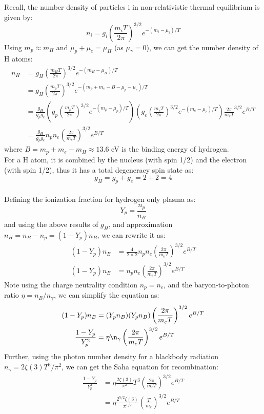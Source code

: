 \bigskip \noindent
\begin{foundation}
    Recall, the number density of particles i in non-relativistic thermal equilibrium is given by:
    \[
        n_i = g_i \left( \frac{m_i T}{2\pi} \right)^{3/2} e^{-(m_i - \mu_i)/T}
    \]
    Using $m_p \approx m_H$ and $\mu_p + \mu_e = \mu_H$ (as $\mu_\gamma = 0$), we can get the number density of H atoms:
    \small \begin{align*}
        n_H &= g_H \left( \frac{m_H T}{2\pi} \right)^{3/2} e^{-(m_H - \mu_H)/T} \\
        &= g_H \left( \frac{m_p T}{2\pi} \right)^{3/2} e^{-(m_p + m_e - B - \mu_p - \mu_e)/T} \\
        &= \frac{g_H}{g_p g_e} \left( g_p \left( \frac{m_p T}{2\pi} \right)^{3/2} e^{-(m_p - \mu_p)/T} \right) \left( g_e \left( \frac{m_e T}{2\pi} \right)^{3/2} e^{-(m_e - \mu_e)/T} \right)  \frac{2\pi}{m_e T}^{3/2} e^{B/T} \\
        &= \frac{g_H}{g_p g_e} n_p n_e \left( \frac{2\pi}{m_e T} \right)^{3/2} e^{B/T}
    \end{align*}
    \normalsize where $B = m_p + m_e - m_H \approx 13.6$ eV is the binding energy of hydrogen.\\

    For a H atom, it is combined by the nucleus (with spin 1/2) and the electron (with spin 1/2), thus it has a total degeneracy spin state as:
    \[
        g_H = g_p + g_e = 2 + 2 = 4
    \] \\

    Defining the ionization fraction for hydrogen only plasma as:
    \[
        Y_p = \frac{n_p}{n_B} 
    \]
    and using the above results of $g_H$, and approximation $n_H = n_B - n_p = (1 - Y_p) n_B$, we can rewrite it as:
    \begin{align*}
        (1 - Y_p) n_B &= \frac{4}{2 \times 2} n_p n_e \left( \frac{2\pi}{m_e T} \right)^{3/2} e^{B/T} \\
        (1 - Y_p) n_B &= n_p n_e \left( \frac{2\pi}{m_e T} \right)^{3/2} e^{B/T} 
    \end{align*} 
    Note using the charge neutrality condition $n_p = n_e$, and the baryon-to-photon ratio $\eta = n_B/n_\gamma$, we can simplify the equation as:
    \begin{align*}
       (1 - Y_p) n_B &= (Y_p n_B) (Y_p n_B) \left( \frac{2\pi}{m_e T} \right)^{3/2} e^{B/T} \\
       \frac{1 - Y_p}{Y_p^2} &= \eta \n_\gamma \left( \frac{2\pi}{m_e T} \right)^{3/2} e^{B/T}
    \end{align*}
    Further, using the photon number density for a blackbody radiation $n_\gamma = 2 \zeta(3) T^3/\pi^2$, we can get the Saha equation for recombination:
    \begin{align*}
        \frac{1 - Y_p}{Y_p^2} &= \eta \frac{2 \zeta(3)}{\pi^2} T^3 \left( \frac{2\pi}{m_e T} \right)^{3/2} e^{B/T} \\
        &= \eta \frac{2^{5/2} \zeta(3)}{\pi^{1/2}} \left( \frac{T}{m_e} \right)^{3/2} e^{B/T}
    \end{align*}
\end{foundation}

